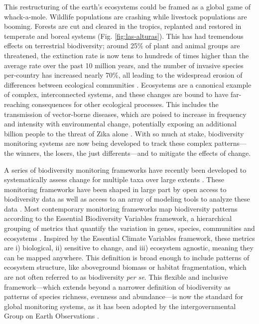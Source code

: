 This restructuring of the earth's ecosystems could be framed as a global game of whack-a-mole. Wildlife populations are crashing while livestock populations are booming. Forests are cut and cleared in the tropics, replanted and restored in temperate and boreal systems (Fig. \ref{fig:las-alturas}). This has had tremendous effects on terrestrial biodiversity; around 25\% of plant and animal groups are threatened, the extinction rate is now tens to hundreds of times higher than the average rate over the past 10 million years, and the number of invasive species per-country has increased nearly 70\%, all leading to the widespread erosion of differences between ecological communities \cite{IPBES2019-hl}. Ecosystems are a canonical example of complex, interconnected systems, and these changes are bound to have far-reaching consequences for other ecological processes. This includes the transmission of vector-borne diseases, which are poised to increase in frequency and intensity with environmental change, potentially exposing an additional billion people to the threat of Zika alone \cite{Ryan2020-ay}. With so much at stake, biodiversity monitoring systems are now being developed to track these complex patterns—the winners, the losers, the just differents—and to mitigate the effects of change.

A series of biodiversity monitoring frameworks have recently been developed to systematically assess change for multiple taxa over large extents \cite{Scholes2012-ec,Fernandez2015-na}. These monitoring frameworks have been shaped in large part by open access to biodiversity data \cite{Kattge2011-tf, Jetz2012-mw, Metzger2013-mz, Culina2018-ih} as well as access to an array of modeling tools to analyze these data \cite{Butchart2010-we, Pettorelli2016-wi, Gorelick2017-nx}. Most contemporary monitoring frameworks map biodiversity patterns according to the Essential Biodiversity Variables framework, a hierarchical grouping of metrics that quantify the variation in genes, species, communities and ecosystems \cite{Pereira2013-pk}. Inspired by the Essential Climate Variables framework, these metrics are i) biological, ii) sensitive to change, and iii) ecosystem agnostic, meaning they can be mapped anywhere. This definition is broad enough to include patterns of ecosystem structure, like aboveground biomass or habitat fragmentation, which are not often referred to as biodiversity \textit{per se}. This flexible and inclusive framework—which extends beyond a narrower definition of biodiversity as patterns of species richness, evenness and abundance—is now the standard for global monitoring systems, as it has been adopted by the intergovernmental Group on Earth Observations \cite{Geo_bon2017-ak}.

